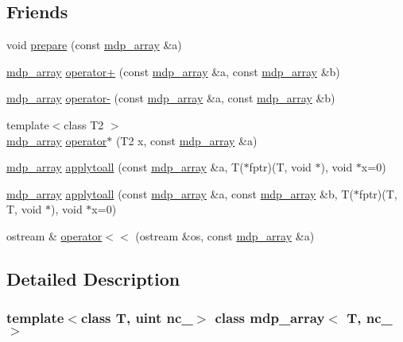 \subsection*{Friends}
\begin{DoxyCompactItemize}
\item 
void \hyperlink{classmdp__array_a7c12113e8b61f3906ff4d15a6cc10fe2}{prepare} (const \hyperlink{classmdp__array}{mdp\_\-array} \&a)
\item 
\hyperlink{classmdp__array}{mdp\_\-array} \hyperlink{classmdp__array_a0456c0c6d5e305cc0799ceb7b8639539}{operator+} (const \hyperlink{classmdp__array}{mdp\_\-array} \&a, const \hyperlink{classmdp__array}{mdp\_\-array} \&b)
\item 
\hyperlink{classmdp__array}{mdp\_\-array} \hyperlink{classmdp__array_a97528690c485585f95cfad74e934e621}{operator-\/} (const \hyperlink{classmdp__array}{mdp\_\-array} \&a, const \hyperlink{classmdp__array}{mdp\_\-array} \&b)
\item 
{\footnotesize template$<$class T2 $>$ }\\\hyperlink{classmdp__array}{mdp\_\-array} \hyperlink{classmdp__array_a153656d696c7d05f5e61deb324e93132}{operator$\ast$} (T2 x, const \hyperlink{classmdp__array}{mdp\_\-array} \&a)
\item 
\hyperlink{classmdp__array}{mdp\_\-array} \hyperlink{classmdp__array_a720a0f3e6c74893b0bb90ddb85e2c7cf}{applytoall} (const \hyperlink{classmdp__array}{mdp\_\-array} \&a, T($\ast$fptr)(T, void $\ast$), void $\ast$x=0)
\item 
\hyperlink{classmdp__array}{mdp\_\-array} \hyperlink{classmdp__array_af47ee2aa085a0ca303f6eb960be0b257}{applytoall} (const \hyperlink{classmdp__array}{mdp\_\-array} \&a, const \hyperlink{classmdp__array}{mdp\_\-array} \&b, T($\ast$fptr)(T, T, void $\ast$), void $\ast$x=0)
\item 
ostream \& \hyperlink{classmdp__array_a5b84c698961f9276308a57923daf4458}{operator$<$$<$} (ostream \&os, const \hyperlink{classmdp__array}{mdp\_\-array} \&a)
\end{DoxyCompactItemize}


\subsection{Detailed Description}
\subsubsection*{template$<$class T, uint nc\_\-$>$ class mdp\_\-array$<$ T, nc\_\- $>$}

